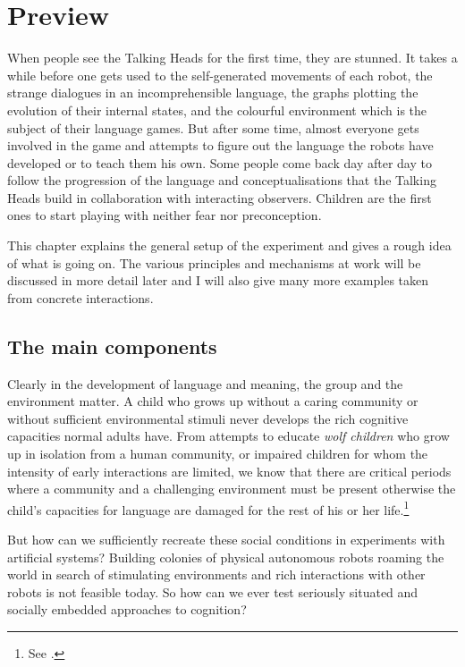 \chapter{Preview}
\label{chap:2}

\setcounter{foot}{1}
When people see the Talking Heads for the first time, they 
are stunned. It takes a while before
one gets used to the self-generated movements of each robot, 
the strange dialogues in an incomprehensible language, 
the graphs plotting the evolution of their internal
states, 
and the colourful environment which is the subject of their 
language games. But after some time, almost everyone gets involved 
in the game and attempts to figure out the language the robots
have developed or to teach them his own. 
Some people come back
day after day to follow the progression
of the language and conceptualisations that the Talking Heads 
build in collaboration with interacting observers.
Children are the first ones to 
start playing with neither fear nor preconception. 

This chapter explains the general setup of the 
experiment and gives a rough idea of what is going on. 
The various principles and mechanisms at work 
will be discussed in more detail later and I will also give many 
more examples taken from concrete interactions.

\section{The main components}

Clearly in the development of language and meaning, 
the group and the environment matter. A child 
who grows up without a caring 
community or without sufficient environmental stimuli
never develops the rich cognitive capacities 
normal adults have. From attempts to educate {\itshape wolf children}
who grow up in isolation from a human community, or 
impaired children for whom the intensity of early 
interactions are limited, we know that 
there are critical periods
where a community and a challenging environment must be
present otherwise the child's capacities for language
are damaged for the 
rest of his or her life.\footnote{See \cite{Tager:1994}.}

But how can we sufficiently 
recreate these social conditions in experiments 
with artificial systems? 
Building colonies of physical autonomous robots
roaming the world in search of stimulating 
environments and rich interactions with
other robots is not feasible today. So how 
can we ever test seriously situated and 
socially embedded approaches to cognition? 


